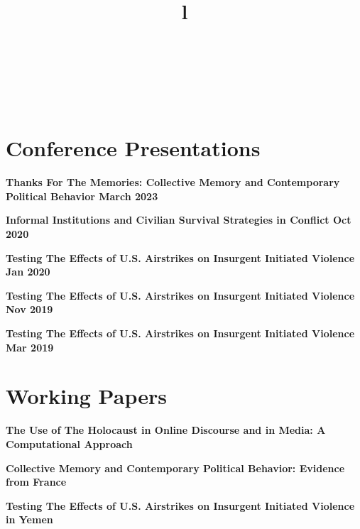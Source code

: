 \documentclass[margin]{res}
\newcommand{\fullhrulefill}{%
  \hspace*{-\sectionwidth}\hrulefill%
  }
\begin{document}
\begin{resume}
\begin{format}
\title{l}\\
\\
\body\\
\end{format}

\fullhrulefill
\section {Conference Presentations}

\textbf {Thanks For The Memories: Collective Memory and Contemporary Political Behavior \hfill{March 2023}  \\ }

\textbf {Informal Institutions and Civilian Survival Strategies in Conflict \hfill{Oct 2020}  \\ }

\textbf {Testing The Effects of U.S. Airstrikes on Insurgent Initiated Violence \hfill{Jan 2020}  \\ }

\textbf {Testing The Effects of U.S. Airstrikes on Insurgent Initiated Violence \hfill{Nov 2019}  \\ }

\textbf {Testing The Effects of U.S. Airstrikes on Insurgent Initiated Violence \hfill{Mar 2019} \\ }
\newpage

\fullhrulefill
\section{Working Papers}

\textbf{The Use of The Holocaust in Online Discourse and in Media: A Computational Approach }

\textbf{Collective Memory and Contemporary Political Behavior: Evidence from France}

\textbf {Testing The Effects of U.S. Airstrikes on Insurgent Initiated Violence in Yemen}



\end{resume}
\end{document}
